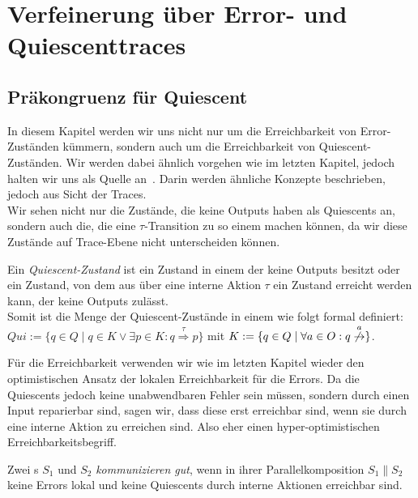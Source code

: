 \chapter{Verfeinerung über Error- und Quiescenttraces}

\section{Präkongruenz für Quiescent}

In diesem Kapitel werden wir uns nicht nur um die Erreichbarkeit von
Error-Zuständen kümmern, sondern auch um die Erreichbarkeit von
Quiescent-Zuständen. Wir werden dabei ähnlich vorgehen wie im letzten Kapitel,
jedoch halten wir uns als Quelle an~\cite{Chilton2013}. Darin werden ähnliche Konzepte
beschrieben, jedoch aus Sicht der Traces.\\
Wir sehen nicht nur die Zustände, die keine Outputs haben als Quiescents an,
sondern auch die, die eine $\tau$-Transition zu so einem machen können, da wir
diese Zustände auf Trace-Ebene nicht unterscheiden können.

\begin{Def}[Quiescent]
  Ein \emph{Quiescent-Zustand} ist ein Zustand in einem \EIO{} der keine Outputs besitzt
  oder ein Zustand, von dem aus über eine interne Aktion $\tau$ ein Zustand
  erreicht werden kann, der keine Outputs zulässt.\\
  Somit ist die Menge der Quiescent-Zustände in einem \EIO{} wie folgt formal
  definiert: $Qui:=\{q\in Q\mid q\in K\vee \exists p\in K:
  q\overset{\tau}{\Rightarrow} p\}$ mit $K:=\{q\in Q\mid \forall a\in O:
  q\overset{a}{\not{\hspace{-0.1cm}\rightarrow}}\}$.
\end{Def}

Für die Erreichbarkeit verwenden wir wie im letzten Kapitel wieder den
optimistischen Ansatz der lokalen Erreichbarkeit für die Errors. Da die
Quiescents jedoch keine unabwendbaren Fehler sein müssen, sondern durch einen
Input reparierbar sind, sagen wir, dass diese erst erreichbar sind, wenn sie
durch eine interne Aktion zu erreichen sind. Also eher einen
hyper-optimistischen Erreichbarkeitsbegriff.

\begin{Def}
  Zwei \EIO{}s $S_1$ und $S_2$ \emph{kommunizieren gut}, wenn in ihrer
  Parallelkomposition $S_1\| S_2$ keine Errors lokal und keine Quiescents durch
  interne Aktionen erreichbar sind.
\end{Def}

